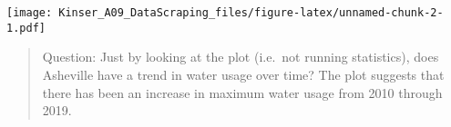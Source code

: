 \documentclass[
]{article}
\begin{document}
\texttt{[image: Kinser\_A09\_DataScraping\_files/figure-latex/unnamed-chunk-2-1.pdf]}

\begin{quote}
Question: Just by looking at the plot (i.e.~not running statistics),
does Asheville have a trend in water usage over time? The plot suggests
that there has been an increase in maximum water usage from 2010 through
2019.
\end{quote}
\end{document}
